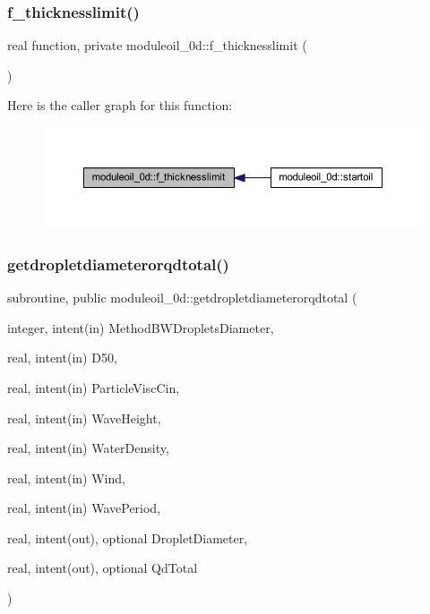 \subsubsection{\texorpdfstring{f\+\_\+thicknesslimit()}{f\_thicknesslimit()}}
{\footnotesize\ttfamily real function, private moduleoil\+\_\+0d\+::f\+\_\+thicknesslimit (\begin{DoxyParamCaption}{ }\end{DoxyParamCaption})\hspace{0.3cm}{\ttfamily [private]}}

Here is the caller graph for this function\+:\nopagebreak
\begin{figure}[H]
\begin{center}
\leavevmode
\includegraphics[width=350pt]{namespacemoduleoil__0d_afe23376b4667259aea9a6e2163036417_icgraph}
\end{center}
\end{figure}
\mbox{\label{namespacemoduleoil__0d_a2282beabe04942e12608b16eecc58ffe}} 
\subsubsection{\texorpdfstring{getdropletdiameterorqdtotal()}{getdropletdiameterorqdtotal()}}
{\footnotesize\ttfamily subroutine, public moduleoil\+\_\+0d\+::getdropletdiameterorqdtotal (\begin{DoxyParamCaption}\item[{integer, intent(in)}]{Method\+B\+W\+Droplets\+Diameter,  }\item[{real, intent(in)}]{D50,  }\item[{real, intent(in)}]{Particle\+Visc\+Cin,  }\item[{real, intent(in)}]{Wave\+Height,  }\item[{real, intent(in)}]{Water\+Density,  }\item[{real, intent(in)}]{Wind,  }\item[{real, intent(in)}]{Wave\+Period,  }\item[{real, intent(out), optional}]{Droplet\+Diameter,  }\item[{real, intent(out), optional}]{Qd\+Total }\end{DoxyParamCaption})}

